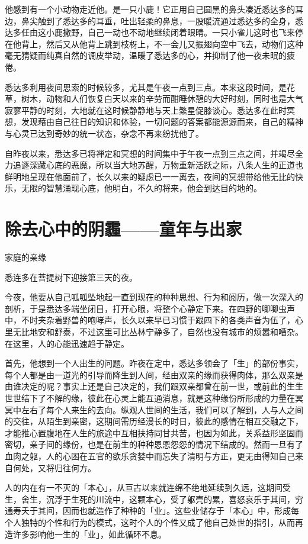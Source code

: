 \documentclass[12pt,twoside,openany]{book}
\begin{document}
他感到有一个小动物走近他。是一只小鹿！它正用自己圆黑的鼻头凑近悉达多的耳边，鼻尖触到了悉达多的耳垂，吐出轻柔的鼻息，一股暖流通过悉达多的全身，悉达多任由这小鹿撒野，自己一动也不动地继续闭着眼睛。一只小雀儿这时也飞来停在他背上，然后又从他背上跳到枝枒上，不一会儿又振翅向空中飞去，动物们这种毫无猜疑而纯真自然的调皮举动，温暖了悉达多的心，并抑制了他一夜未眠的疲倦。

悉达多利用夜间思索的时候较多，尤其是午夜一点到三点。本来这段时间，是花草，树木，动物和人们恢复白天以来的辛劳而酣睡休憩的大好时刻，同时也是大气寂寥平静的时刻，大地就在这时候静静地与天上繁星促膝谈心。悉达多在此时冥想，发现藉由自己往日的知识和体验，一切问题的答案都能源源而来，自己的精神与心灵已达到奇妙的统一状态，杂念不再来纷扰他了。

自昨夜以来，悉达多已将禅定和冥想的时间集中于午夜一点到三点之间，并竭尽全力追逐深藏心底的恶魔，所以当大地苏醒，万物重新活跃之际，八条人生的正道也鲜明地呈现在他面前了，长久以来的疑虑已一一离去，夜间的冥想带给他无比的快乐，无限的智慧涌现心底，他明白，不久的将来，他会到达目的地的。

\section{除去心中的阴霾——童年与出家}\label{sec1.12}

家庭的亲缘

悉连多在菩提树下迎接第三天的夜。

今夜，他要从自己呱呱坠地起一直到现在的种种思想、行为和阅历，做一次深入的剖析，于是悉达多端坐闭目，打开心眼，将整个心静定下来。在四野的唧唧虫声中，不时夹杂着野兽的咆哮声，长久以来早已习惯于跟四下的各类声音为伍了，心里无比地安和舒泰，不过这里可比丛林宁静多了，自然也没有城市的烦嚣和嘈杂。在这里，人的心能迅速趋于静定。

首先，他想到一个人出生的问题。昨夜在定中，悉达多领会了「生」的部份事实，每个人都是由一道光的引导而降生到人间，经由双亲的缘而获得肉体，那么双亲是由谁决定的呢？事实上还是自己决定的，我们跟双亲都曾在前一世，或前此的生生世世结下了不解的缘，彼此在心灵上能互通消息，就是这种缘份所形成的力量在冥冥中左右了每个人来生的去向。纵观人世间的生活，我们可以了解到，人与人之间的交往，从陌生到亲密，这期间需历经漫长的时日，彼此的感情在相互交融之下，才能推心置腹地在人生的旅途中互相扶持同甘共苦，也因为如此，关系益形坚固而密切，亲子间的缘份，也是在前生的种种恩恩怨怨的情况下结成的。然而一旦有了血肉之躯，人的心困在五官的欲乐贪婪中而忘失了清明与方正，更无由得知自己来自何处，又将归往何方。

人的内在有一不灭的「本心」，从亘古以来就连绵不绝地延续到久远，这期间受生，舍生，沉浮于生死的川流中，这颗本心，受了躯壳的累，喜怒哀乐于其间，穷通寿夭于其间，因而也就造作了种种的「业」。这些业储存于「本心」中，形成每个人独特的个性和行为的模式，这时个人的个性又成了他自己处世的指引，从而再造许多影响他一生的「业」，如此循环不息。
\end{document}
